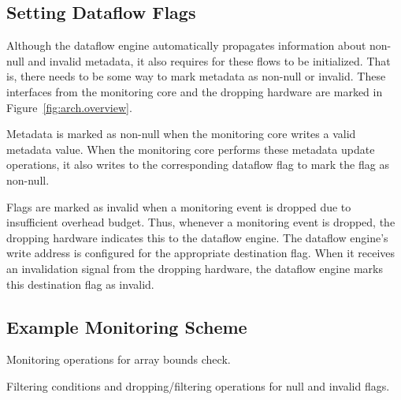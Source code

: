 \subsection{Setting Dataflow Flags}
\label{sec:arch.dropping}

Although the dataflow engine automatically propagates information about
non-null and invalid metadata, it also requires for these flows to be
initialized. That is, there needs to be some way to mark metadata as non-null
or invalid. These interfaces from the monitoring core and the dropping hardware
are marked in Figure~\ref{fig:arch.overview}.

Metadata is marked as non-null when the monitoring core writes a valid metadata
value. When the monitoring core performs these metadata update operations, it
also writes to the corresponding dataflow flag to mark the flag as non-null.

Flags are marked as invalid when a monitoring event is dropped due to
insufficient overhead budget. Thus, whenever a monitoring event is dropped, the
dropping hardware indicates this to the dataflow engine. The dataflow engine's
write address is configured for the appropriate destination flag. When it
receives an invalidation signal from the dropping hardware, the
dataflow engine marks this destination flag as invalid.

\subsection{Example Monitoring Scheme}

\begin{table}[tb]
  \begin{center}
    \begin{small}
    
    \end{small}
    \caption{Monitoring operations for array bounds check.}
    \label{tab:arch.monitor}
    \vspace{-0.2in}
  \end{center}
\end{table}

\begin{table}[tb]
  \begin{center}
    \begin{small}
    
    \end{small}
    \caption{Filtering conditions and dropping/filtering operations for null and invalid flags.}
    \label{tab:arch.dataflow_operations}
    \vspace{-0.2in}
  \end{center}
\end{table}

